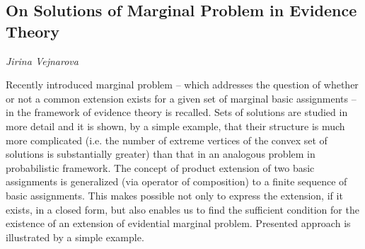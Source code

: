 \documentclass[../booklet.tex]{subfiles}
\begin{document}
\subsection[On Solutions of Marginal Problem in Evidence Theory. {\it Jirina Vejnarova}]{On Solutions of Marginal Problem in Evidence Theory}

\begin{center}
  {\it Jirina Vejnarova}
\end{center}



Recently introduced marginal problem -- which addresses the question
of whether or not a common extension exists for a given set of
marginal basic assignments -- in the framework of evidence theory is
recalled. Sets of solutions are studied in more detail and it is
shown, by a simple example, that their structure is much more
complicated (i.e. the number of extreme vertices of the convex set
of solutions is substantially greater) than that in an analogous
problem in probabilistic framework. The concept of product extension
of two basic assignments is generalized (via operator of
composition) to a finite sequence of basic assignments. This makes
possible not only to express the extension, if it exists, in a
closed form, but also enables us to find the sufficient condition
for the existence of an extension of evidential marginal problem.
Presented approach is illustrated by a simple example.

\end{document}
